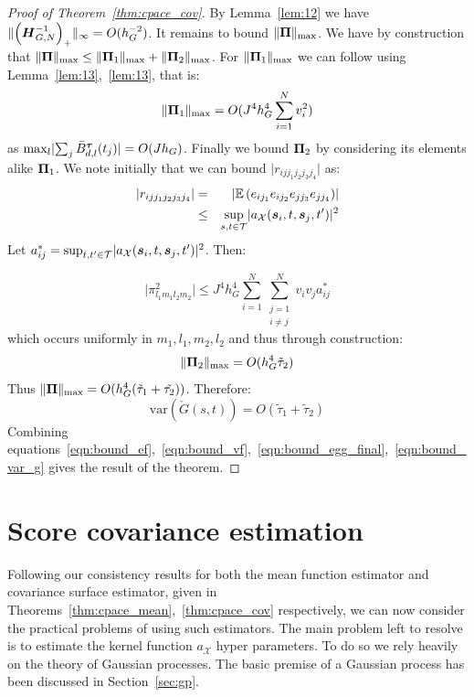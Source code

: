 \begin{proof}[Proof of Theorem~\ref{thm:cpace_cov}]
By Lemma~\ref{lem:12} we have $\lVert \left(\bm{{H}}_{G, N}^{-1}\right)_+ \rVert_\infty = O(h_G^{-2})$.
It remains to bound $\lVert \bm{{\Pi}} \rVert_\text{max}$. 
We have by construction that $\lVert \bm{{\Pi}} \rVert_\text{max} \le \lVert \bm{{\Pi}}_{1} \rVert_\text{max} + \lVert \bm{{\Pi}}_{2} \rVert_\text{max} $.
For $\lVert \bm{{\Pi}}_{1} \rVert_\text{max}$ we can follow \citep{xiao_asymptotic_2020} using Lemma~\ref{lem:13},~\ref{lem:13}, that is: 
\begin{equation}
	\lVert \bm{{\Pi}}_{1} \rVert_\text{max} = O(J^4 h_G^4 \sum_{i=1}^N v_i^2)
\end{equation}
as $\max_l \lvert \sum_j  \bar{B}_{d, l}^{\bm{{\tau}}}(t_{j}) \rvert = O(Jh_G)$. 
Finally we bound $\bm{{\Pi}}_{2}$ by considering its elements alike $\bm{{\Pi}}_{1}$. 
We note initially that we can bound $\lvert r_{ijj_1j_2j_3j_4} \rvert$ as:
\begin{eqnarray}
	\lvert r_{ijj_1j_2j_3j_4} \rvert &=& \lvert \mathbb{E}\left(e_{ij_1} e_{ij_2} e_{jj_3} e_{jj_4} \right) \rvert \\
	&\leq& \sup_{s,t \in \mathcal{T}}\lvert a_\mathcal{X}(\bm{{s}}_{i}, t, \bm{{s}}_{j}, t^\prime) \rvert^2
\end{eqnarray}
Let $a_{ij}^* = \sup_{t, t^\prime \in \mathcal{T}}\lvert a_\mathcal{X}(\bm{{s}}_{i}, t, \bm{{s}}_{j}, t^\prime) \rvert^2$. Then: 

\begin{equation}
	\lvert \pi_{l_1m_1l_2m_2}^2  \rvert \leq J^4 h_G^4 \sum_{i=1}^N \sum_{\substack{j=1 \\ i \ne j}}^N v_i v_j a_{ij}^* 
\end{equation}
which occurs uniformly in $m_1, l_1, m_2, l_2$ and thus through construction:
\begin{equation}
	\lVert \bm{{\Pi}}_{2} \rVert_\text{max} = O(h_G^4 \tilde{\tau}_2)
\end{equation}
Thus $\lVert \bm{{\Pi}} \rVert_\text{max} = O(h_G^4(\tilde{\tau}_1 + \tilde{\tau_2}))$.
Therefore:
\begin{equation}
	\text{var}\left(\check{G}(s,t)\right) = O(\tilde{\tau}_1 + \tilde{\tau}_2)
	\label{eqn:bound_var_g}
\end{equation}
Combining equations~\ref{eqn:bound_ef},~\ref{eqn:bound_vf},~\ref{eqn:bound_egg_final},~\ref{eqn:bound_var_g} gives the result of the theorem.
\end{proof}

\section{Score covariance estimation \label{sec:cpace_score_estim}}
Following our consistency results for both the mean function estimator and covariance surface estimator, given in Theorems~\ref{thm:cpace_mean},~\ref{thm:cpace_cov} respectively, we can now consider the practical problems of using such estimators.
The main problem left to resolve is to estimate the kernel function $a_\mathcal{X}$  hyper parameters. 
To do so we rely heavily on the theory of Gaussian processes. 
The basic premise of a Gaussian process has been discussed in Section~\ref{sec:gp}.

